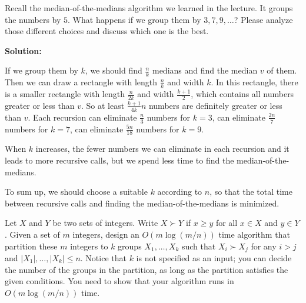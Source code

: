 \documentclass{oxmathproblems}
\begin{document}
\begin{questions}

\miquestion[25]
Recall the median-of-the-medians algorithm we learned in the lecture. It groups the numbers by $5$. What happens if we group them by $3,7,9, \dots$? Please analyze those different choices and discuss which one is the best. 

\textbf{Solution:}

If we group them by $k$, we should find $\frac{n}{k}$ medians and find the median $v$ of them. Then we can draw a rectangle with length $\frac{n}{k}$ and width $k$. In this rectangle, there is a smaller rectangle with length $\frac{n}{2k}$ and width $\frac{k+1}{2}$, which contains all numbers greater or less than $v$. So at least $\frac{k+1}{4k}n$ numbers are definitely greater or less than $v$. Each recursion can eliminate $\frac{n}{3}$ numbers for $k = 3$, can eliminate $\frac{2n}{7}$ numbers for $k = 7$, can eliminate $\frac{5n}{18}$ numbers for $k = 9$.

When $k$ increases, the fewer numbers we can eliminate in each recursion and it leads to more recursive calls, but we spend less time to find the median-of-the-medians. 

To sum up, we should choose a suitable $k$ according to $n$, so that the total time between recursive calls and finding the median-of-the-medians is minimized.

\miquestion[25]
Let $X$ and $Y$ be two sets of integers.
Write $X\succ Y$ if $x\geq y$ for all $x\in X$ and $y\in Y$.
Given a set of $m$ integers, design an $O(m\log(m/n))$ time algorithm that partition these $m$ integers to $k$ groups $X_1,\ldots,X_k$ such that $X_i\succ X_j$ for any $i>j$ and $|X_1|,\ldots,|X_k|\leq n$.
Notice that $k$ is not specified as an input; you can decide the number of the groups in the partition, as long as the partition satisfies the given conditions.
You need to show that your algorithm runs in $O(m\log(m/n))$ time.


\end{questions}
\end{document}

